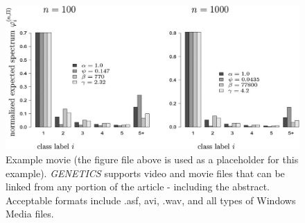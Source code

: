 \documentclass[9pt,twocolumn,twoside]{gsajnl}
\begin{document}
\begin{figure}[htbp]
\centering
\includegraphics[width=\linewidth]{example-figure}
\caption{Example movie (the figure file above is used as a placeholder for this example). \textit{GENETICS} supports video and movie files that can be linked from any portion of the article - including the abstract. Acceptable formats include .asf, avi, .wav, and all types of Windows Media files.   
}%
\label{video:spectrum}
\end{figure}


\end{document}
